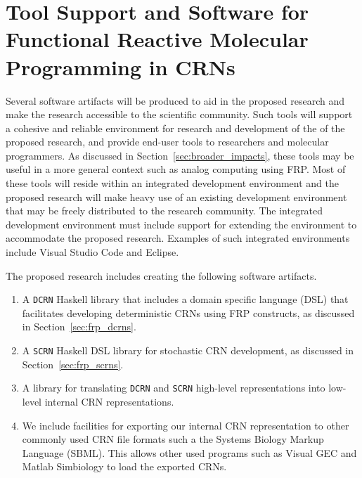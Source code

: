 
\section{Tool Support and Software for Functional Reactive Molecular Programming in CRNs}
\label{sec:software_support}

Several software artifacts will be produced to aid in the proposed research and make the research accessible to the scientific community.  Such tools will support a cohesive and reliable environment for research and development of the of the proposed research, and provide end-user tools to researchers and molecular programmers.  As discussed in Section~\ref{sec:broader_impacts}, these tools may be useful in a more general context such as analog computing using FRP.
Most of these tools will reside within an integrated development environment and the proposed research will make heavy use of an existing development environment that may be freely distributed to the research community.
The integrated development environment must include support for extending the environment to accommodate the proposed research.
Examples of such integrated environments include Visual Studio Code and Eclipse.

The proposed research includes creating the following software artifacts.
\begin{enumerate}
	\item A \texttt{DCRN} Haskell library that includes a domain specific language (DSL) that facilitates developing deterministic CRNs using FRP constructs, as discussed in Section~\ref{sec:frp_dcrns}.
	
	\item A \texttt{SCRN} Haskell DSL library for stochastic CRN development, as discussed in Section~\ref{sec:frp_scrns}.
	
	\item A library for translating \texttt{DCRN} and \texttt{SCRN} high-level representations into low-level internal CRN representations.

	\item We include facilities for exporting our internal CRN representation to other commonly used CRN file formats such a the Systems Biology Markup Language (SBML).
	This allows other used programs such as Visual GEC and Matlab Simbiology to load the exported CRNs.
\end{enumerate}

